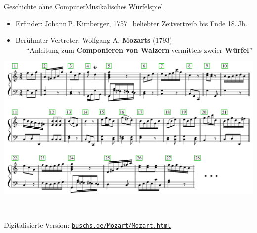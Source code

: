 \begin{frame}{Geschichte ohne Computer}{Musikalisches Würfelspiel}

	\begin{itemize}
	\item Erfinder: Johann\,P. Kirnberger, 1757 \conclude~beliebter Zeitvertreib bis Ende 18.\,Jh.
	\item Berühmter Vertreter: Wolfgang A. \textbf{Mozarts} (1793) \citep[294d/516f]{KoechelVZ}\\
	~~~\enquote{Anleitung zum \textbf{Componieren von Walzern} vermittels zweier \textbf{Würfel}} 
	\end{itemize}	
	
	\begin{multicols}{2}
	\includegraphics[width=.52\textwidth]{img/Wuerfelspiel_Noten.png}
	
	~~
	\end{multicols}

	\hfill \footnotesize Digitalisierte Version: \href{https://www.buschs.de/Mozart/Mozart.html}{\texttt{buschs.de/Mozart/Mozart.html}}
	
\end{frame}

